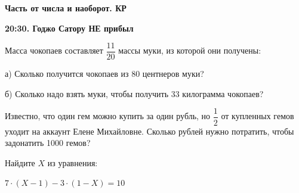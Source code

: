 \centerline{\bf \Huge Часть от числа и наоборот. КР}
\centerline{\bf \Huge }

\begin{flushright}
        \scriptsize{\textbf{20:30. Годжо Сатору НЕ прибыл}}
\end{flushright}

 Масса чокопаев составляет $\dfrac{11}{20}$ массы муки, из которой они получены:

а) Сколько получится чокопаев из 80 центнеров муки?

б) Сколько надо взять муки, чтобы получить 33 килограмма чокопаев?


 Известно, что один гем можно купить за один рубль, но $\dfrac{1}{2}$ от купленных гемов уходит на аккаунт Елене Михайловне. Сколько рублей нужно потратить, чтобы задонатить 1000 гемов?

 Найдите $X$ из уравнения:

$7\cdot(X-1)-3\cdot(1-X)=10$
